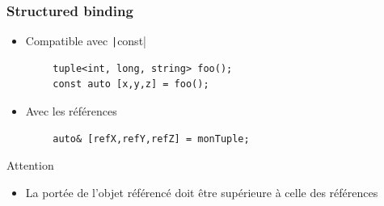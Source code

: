 \documentclass[C++.tex]{subfiles}
\begin{document}
\begin{frame}[fragile]
	\frametitle{Structured binding}
	\begin{itemize}
		\item Compatible avec \texttt|const|
	\end{itemize}

	\begin{verbatim}
		tuple<int, long, string> foo();
		const auto [x,y,z] = foo();
	\end{verbatim}

	\begin{itemize}
		\item Avec les références
	\end{itemize}

	\begin{verbatim}
		auto& [refX,refY,refZ] = monTuple;
	\end{verbatim}

	\begin{alertblock}{Attention}
		\begin{itemize}
			\item La portée de l'objet référencé doit être supérieure à celle des références
		\end{itemize}
	\end{alertblock}
\end{frame}
\end{document}

